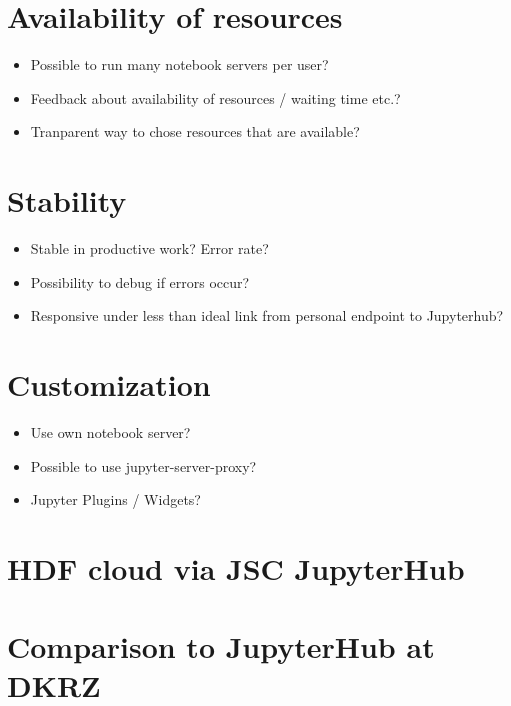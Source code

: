 \documentclass[11pt,a4paper]{article}
\begin{document}
\section{Availability of resources}
\label{s-availability-resources}

\begin{itemize}
  \item Possible to run many notebook servers per user?
  \item Feedback about availability of resources / waiting time etc.?
  \item Tranparent way to chose resources that are available?
\end{itemize}


\section{Stability}
\label{s-stability}

\begin{itemize}
	\item Stable in productive work? Error rate?
  \item Possibility to debug if errors occur?
  \item Responsive under less than ideal link from personal endpoint to Jupyterhub?
\end{itemize}


\section{Customization}
\label{s-customization}

\begin{itemize}
	\item Use own notebook server?
  \item Possible to use jupyter-server-proxy?
  \item Jupyter Plugins / Widgets?
\end{itemize}


\section{HDF cloud via JSC JupyterHub}
\label{s-hdfcloud-jsc-jhub}


\section{Comparison to JupyterHub at DKRZ}
\label{s-comparison-dkrz}



\end{document}
